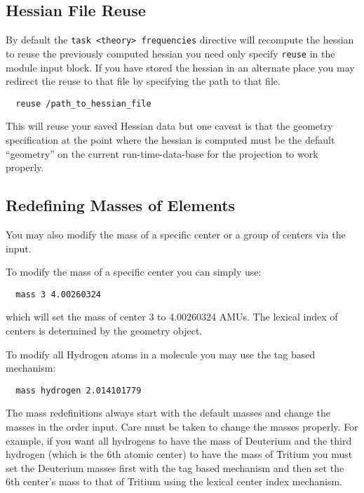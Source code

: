\subsection{Hessian File Reuse}
By default the \verb+task <theory> frequencies+ directive will
recompute the hessian to reuse the previously computed hessian you
need only specify \verb+reuse+ in the module input block.  If you
have stored the hessian in an alternate place you may redirect the 
reuse to that file by specifying the path to that file.
\begin{verbatim}
  reuse /path_to_hessian_file
\end{verbatim}
This will reuse your saved Hessian data but one caveat is that the
geometry specification at the point where the hessian is computed must
be the default ``geometry'' on the current run-time-data-base for the
projection to work properly.

\subsection{Redefining Masses of Elements}
You may also modify the mass of a specific center or a group of
centers via the input.  

To modify the mass of a specific center you can simply use:
\begin{verbatim}
  mass 3 4.00260324
\end{verbatim}
which will set the mass of center 3 to 4.00260324 AMUs.  The lexical
index of centers is determined by the geometry object. 

To modify all Hydrogen atoms in a molecule you may use the tag based
mechanism:
\begin{verbatim}
  mass hydrogen 2.014101779
\end{verbatim}

The mass redefinitions always start with the default masses and
change the masses in the order input.  Care must be taken to change
the masses properly.  For example, if you want all hydrogens to have
the mass of Deuterium and the third hydrogen (which is the 6th atomic
center) to have the mass of Tritium you must set the Deuterium masses
first with the tag based mechanism and then set the 6th center's mass
to that of Tritium using the lexical center index mechanism.  

